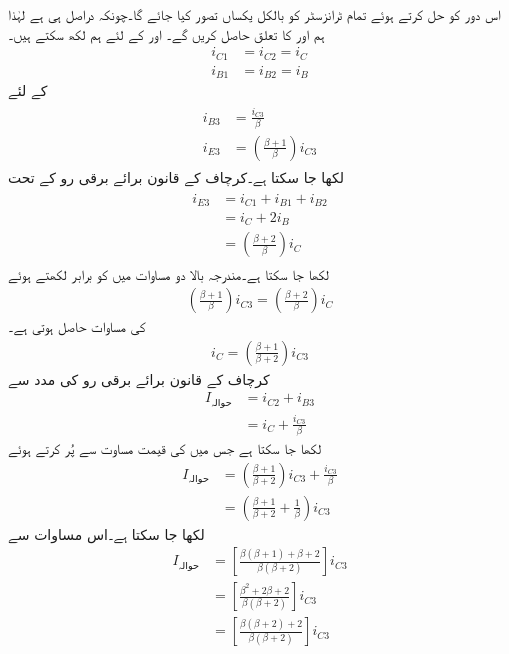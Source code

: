 اس دور کو حل کرتے ہوئے تمام ٹرانزسٹر کو بالکل یکساں تصور کیا جائے گا۔چونکہ  دراصل  ہی ہے لہٰذا ہم  اور  کا تعلق حاصل کریں گے۔ اور  کے لئے ہم لکھ سکتے ہیں۔
\begin{align*}
i_{C1}&=i_{C2}=i_C\\
i_{B1}&=i_{B2}=i_B
\end{align*}
 کے لئے
\begin{gather}\label{مساوات_تفرقی_ولسن_تیسرے_ٹرانزسٹر_رو}
\begin{aligned}
i_{B3}&=\frac{i_{C3}}{\beta}\\
i_{E3}&=\left(\frac{\beta+1}{\beta}\right) i_{C3}
\end{aligned}
\end{gather}
لکھا جا سکتا ہے۔کرچاف کے قانون برائے برقی رو کے تحت
\begin{gather}
\begin{aligned}\label{مساوات_تفرقی_ولسن_کرچاف_کا_قانون}
i_{E3}&=i_{C1}+i_{B1}+i_{B2}\\
&=i_C+2 i_B\\
&=\left(\frac{\beta+2}{\beta} \right) i_C
\end{aligned}
\end{gather}
لکھا جا سکتا ہے۔مندرجہ بالا دو مساوات میں  کو برابر لکھتے ہوئے
\begin{align*}
\left(\frac{\beta+1}{\beta}\right) i_{C3}=\left(\frac{\beta+2}{\beta} \right) i_C
\end{align*}
 کی مساوات حاصل ہوتی ہے۔
\begin{align}\label{مساوات_تفرقی_محاصل_رو_کی_مساوات}
i_C=\left(\frac{\beta+1}{\beta+2}\right) i_{C3}
\end{align}
کرچاف کے قانون برائے برقی رو کی مدد سے 
\begin{align*}
I_{\textrm{حوالہ}}&=i_{C2}+i_{B3}\\
&=i_{C}+\frac{i_{C3}}{\beta}
\end{align*}
لکھا جا سکتا ہے جس میں  کی قیمت مساوت  سے پُر کرتے ہوئے
\begin{align*}
I_{\textrm{حوالہ}}&=\left(\frac{\beta+1}{\beta+2}\right) i_{C3}+\frac{i_{C3}}{\beta}\\
&=\left(\frac{\beta+1}{\beta+2}+\frac{1}{\beta} \right) i_{C3}
\end{align*}
لکھا جا سکتا ہے۔اس مساوات سے
\begin{align*}
I_{\textrm{حوالہ}}&=\left[\frac{\beta \left(\beta+1 \right)+\beta+2}{\beta \left(\beta+2 \right)}\right]i_{C3}\\
&=\left[\frac{\beta^2+2 \beta+2}{\beta \left(\beta+2 \right)}\right]i_{C3}\\
&=\left[\frac{\beta \left(\beta+2 \right)+2}{\beta \left(\beta+2 \right)}\right]i_{C3}
\end{align*}
